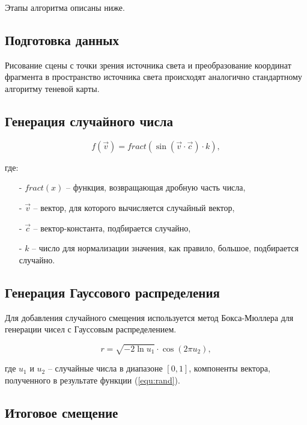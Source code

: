 Этапы алгоритма описаны ниже.

\subsection*{Подготовка данных}

Рисование сцены с точки зрения источника света и
преобразование координат фрагмента в пространство источника света
происходят аналогично стандартному алгоритму теневой карты.

\subsection*{Генерация случайного числа}

\begin{equation}
    \label{equ:rand}
    f(\vec{v}) = fract(\sin(\vec{v} \cdot \vec{c}) \cdot k),
\end{equation}

\noindent где:

\begin{itemize}
    \item[-] $fract(x)$ -- функция, возвращающая дробную часть числа,
    \item[-] $\vec{v}$ -- вектор, для которого вычисляется случайный вектор,
    \item[-] $\vec{c}$ -- вектор-константа, подбирается случайно,
    \item[-] $k$ -- число для нормализации значения, как правило, большое, подбирается случайно.
\end{itemize}

\subsection*{Генерация Гауссового распределения}

Для добавления случайного смещения используется метод Бокса-Мюллера
для генерации чисел с Гауссовым распределением.

\begin{equation}
    \label{equ:Box_Muller_Gauss}
    r = \sqrt{-2 \ln u_1} \cdot \cos(2 \pi u_2),
\end{equation}

\noindent где $u_1$ и $u_2$ -- случайные числа в диапазоне \([0, 1]\),
компоненты вектора, полученного в результате функции (\ref{equ:rand}).

\subsection*{Итоговое смещение}

